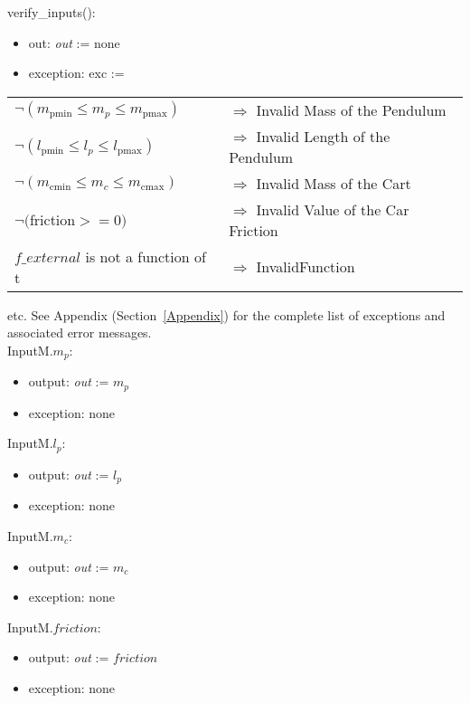 \documentclass[12pt, titlepage]{article}
\begin{document}
\noindent verify\_inputs():
\begin{itemize}
\item out: \textit{out} := none
\item exception: exc := 
\end{itemize}

\noindent \begin{longtable*}[l]{l l} 
$\neg (m_{\text{pmin}} \leq m_p \leq m_{\text{pmax}})$ & $\Rightarrow$ Invalid Mass of the Pendulum\\

$\neg (l_{\text{pmin}} \leq l_p \leq l_{\text{pmax}})$& $\Rightarrow$  Invalid Length of the Pendulum\\
$\neg (m_{\text{cmin}} \leq m_c\leq m_{\text{cmax}})$ & $\Rightarrow$  Invalid Mass of the Cart \\
$\neg ($friction$ >= 0)$ & $\Rightarrow$ Invalid Value of the Car Friction\\
$f\_external$ is not a function of t & $\Rightarrow$ InvalidFunction\\
\end{longtable*}
etc.  See Appendix (Section~\ref{Appendix}) for the complete list of exceptions and associated error messages.\\
\newline
\noindent InputM.$m_p$:
\begin{itemize}
\item output: \textit{out} := $m_p$
\item exception: none
\end{itemize}

\noindent InputM.$l_p$:
\begin{itemize}
\item output: \textit{out} := $l_p$
\item exception: none
\end{itemize}

\noindent InputM.$m_c$:
\begin{itemize}
\item output: \textit{out} := $m_c$
\item exception: none
\end{itemize}

\noindent InputM.$friction$:
\begin{itemize}
\item output: \textit{out} := $friction$
\item exception: none
\end{itemize}\noindent 
\end{document}
